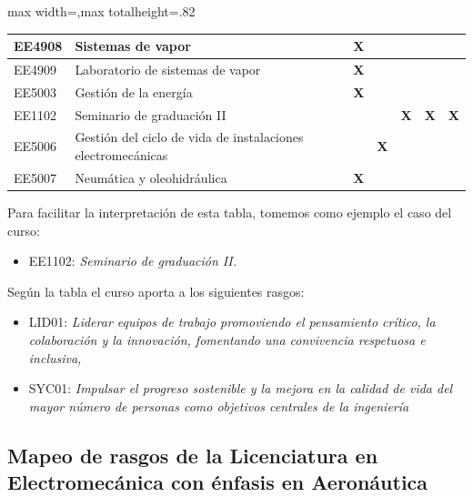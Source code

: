 \begin{center}
\begin{adjustbox}{max width=\textwidth,max totalheight=.82\textheight}
\begin{tabular}{|l|p{4.6cm}|c|c|c|c|c|c|c|}
EE4908 & Sistemas de vapor & \textbf{ } & \textbf{ } & \textbf{X} & \textbf{ } & \textbf{ } & \textbf{ } & \textbf{ } \\ \hline
\rowcolor{azulTabla}
EE4909 & Laboratorio de sistemas de vapor & \textbf{ } & \textbf{ } & \textbf{X} & \textbf{ } & \textbf{ } & \textbf{ } & \textbf{ } \\ \hline
EE5003 & Gestión de la energía & \textbf{ } & \textbf{ } & \textbf{X} & \textbf{ } & \textbf{ } & \textbf{ } & \textbf{ } \\ \hline
\rowcolor{azulTabla}
EE1102 & Seminario de graduación II & \textbf{ } & \textbf{ } & \textbf{ } & \textbf{ } & \textbf{X} & \textbf{X} & \textbf{X} \\ \hline
EE5006 & Gestión del ciclo de vida de instalaciones electromecánicas & \textbf{ } & \textbf{ } & \textbf{ } & \textbf{X} & \textbf{ } & \textbf{ } & \textbf{ } \\ \hline
\rowcolor{azulTabla}
EE5007 & Neumática y oleohidráulica & \textbf{ } & \textbf{ } & \textbf{X} & \textbf{ } & \textbf{ } & \textbf{ } & \textbf{ } \\ \hline
\end{tabular}
\end{adjustbox}
\end{center}

Para facilitar la interpretación de esta tabla, tomemos como ejemplo el caso del curso:\par

\begin{itemize}
\item EE1102: \textit{Seminario de graduación II}\textit{.}
\end{itemize}
Según la tabla el curso aporta a los siguientes rasgos:\par

\begin{itemize}
\item LID01: \textit{Liderar equipos de trabajo promoviendo el pensamiento crítico, la colaboración y la innovación, fomentando una convivencia respetuosa e inclusiva}\textit{,}
\item SYC01: \textit{Impulsar el progreso sostenible y la mejora en la calidad de vida del mayor número de personas como objetivos centrales de la ingeniería}
\end{itemize}
\subsection*{Mapeo de rasgos de la Licenciatura en Electromecánica con énfasis en Aeronáutica}

